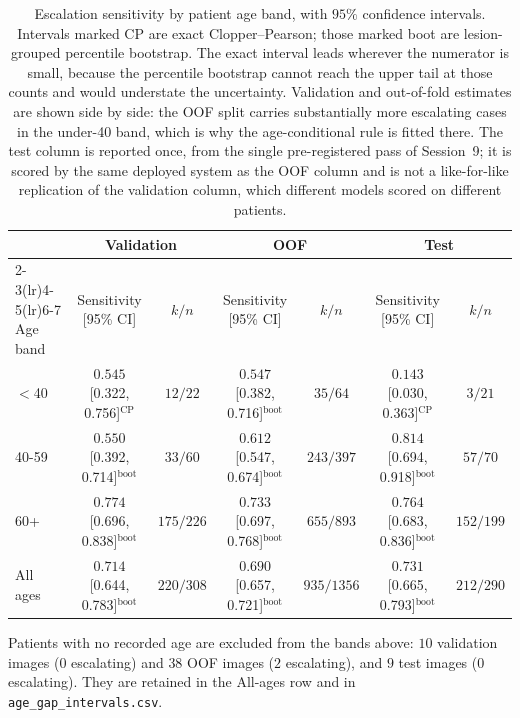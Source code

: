 \begin{table}[t]
\centering
\caption{Escalation sensitivity by patient age band, with $95\%$ confidence intervals. Intervals marked CP are exact Clopper--Pearson; those marked boot are lesion-grouped percentile bootstrap. The exact interval leads wherever the numerator is small, because the percentile bootstrap cannot reach the upper tail at those counts and would understate the uncertainty. Validation and out-of-fold estimates are shown side by side: the OOF split carries substantially more escalating cases in the under-40 band, which is why the age-conditional rule is fitted there. The test column is reported once, from the single pre-registered pass of Session~9; it is scored by the same deployed system as the OOF column and is not a like-for-like replication of the validation column, which different models scored on different patients.}
\label{tab:agegap}
\begin{tabular}{lcccccc}
\toprule
& \multicolumn{2}{c}{Validation} & \multicolumn{2}{c}{OOF} & \multicolumn{2}{c}{Test} \\
\cmidrule(lr){2-3}\cmidrule(lr){4-5}\cmidrule(lr){6-7}
Age band & Sensitivity [95\% CI] & $k/n$ & Sensitivity [95\% CI] & $k/n$ & Sensitivity [95\% CI] & $k/n$ \\
\midrule
$<$40 & $0.545$ [0.322, 0.756]$^{\text{CP}}$ & $12/22$ & $0.547$ [0.382, 0.716]$^{\text{boot}}$ & $35/64$ & $0.143$ [0.030, 0.363]$^{\text{CP}}$ & $3/21$ \\
40-59 & $0.550$ [0.392, 0.714]$^{\text{boot}}$ & $33/60$ & $0.612$ [0.547, 0.674]$^{\text{boot}}$ & $243/397$ & $0.814$ [0.694, 0.918]$^{\text{boot}}$ & $57/70$ \\
60+ & $0.774$ [0.696, 0.838]$^{\text{boot}}$ & $175/226$ & $0.733$ [0.697, 0.768]$^{\text{boot}}$ & $655/893$ & $0.764$ [0.683, 0.836]$^{\text{boot}}$ & $152/199$ \\
All ages & $0.714$ [0.644, 0.783]$^{\text{boot}}$ & $220/308$ & $0.690$ [0.657, 0.721]$^{\text{boot}}$ & $935/1356$ & $0.731$ [0.665, 0.793]$^{\text{boot}}$ & $212/290$ \\
\bottomrule
\end{tabular}
\par\smallskip\footnotesize Patients with no recorded age are excluded from the bands above: $10$ validation images ($0$ escalating) and $38$ OOF images ($2$ escalating), and $9$ test images ($0$ escalating). They are retained in the All-ages row and in \texttt{age\_gap\_intervals.csv}.
\end{table}
